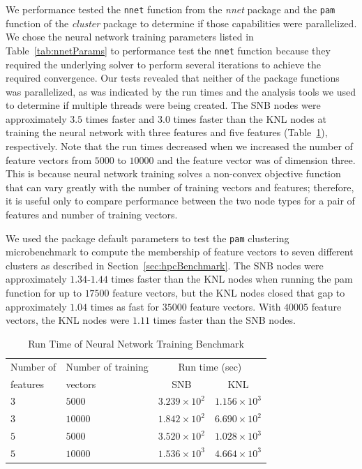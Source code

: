 We performance tested the \texttt{nnet} function from the \textit{nnet} package
  and the \texttt{pam} function of the \textit{cluster} package to determine if
  those capabilities were parallelized.
We chose the neural network training parameters listed in
  Table~\ref{tab:nnetParams} to performance test the \texttt{nnet} function
  because they required the underlying solver to perform several iterations to
  achieve the required convergence.
Our tests revealed that neither of the package functions was parallelized, as
  was indicated by the run times and the analysis tools we used to determine if
  multiple threads were being created.
The SNB nodes were approximately $3.5$ times faster and $3.0$ times
  faster than the KNL nodes at training the neural network with
  three features and five features (Table~\ref{tab:nnetResults}), respectively.
Note that the run times decreased when we increased the number of feature
  vectors from $5000$ to $10000$ and the feature vector was of dimension three.
This is because neural network training solves a non-convex objective function
  that can vary greatly with the number of training vectors and features;
  therefore, it is useful only to compare performance between the two node types
  for a pair of features and number of training vectors.

We used the package default parameters to test the \texttt{pam} clustering
  microbenchmark to compute the membership of feature vectors to seven
  different clusters as described in Section~\ref{sec:hpcBenchmark}.
The SNB nodes were approximately $1.34$-$1.44$ times faster than the KNL nodes
  when running the pam function for up to $17500$ feature vectors, but the KNL
  nodes closed that gap to approximately $1.04$ times as fast for $35000$
  feature vectors.
With $40005$ feature vectors, the KNL nodes were $1.11$ times faster than the
  SNB nodes.

\begin{table}
  \caption{Run Time of Neural Network Training Benchmark}
  \label{tab:nnetResults}
  \begin{tabular}{llcc}
    \toprule
      Number of & Number of training & \multicolumn{2}{c}{Run time (sec)}\\
      features  & vectors            & SNB & KNL\\
    \midrule
    $3$ & $5000$  & $3.239\times 10^{2}$ & $1.156\times 10^{3}$ \\
    $3$ & $10000$ & $1.842\times 10^{2}$ & $6.690\times 10^{2}$ \\
    $5$ & $5000$  & $3.520\times 10^{2}$ & $1.028\times 10^{3}$ \\
    $5$ & $10000$ & $1.536\times 10^{3}$ & $4.664\times 10^{3}$ \\
    \bottomrule
  \end{tabular}
\end{table}

